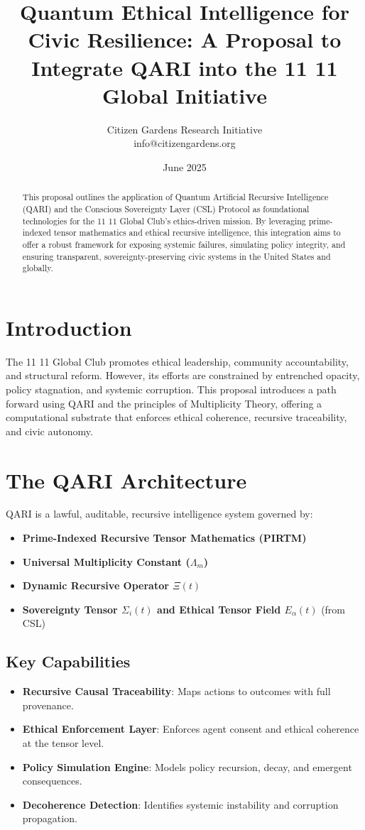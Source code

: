 \documentclass[12pt]{article}
\title{Quantum Ethical Intelligence for Civic Resilience: \newline \large A Proposal to Integrate QARI into the 11 11 Global Initiative}
\author{Citizen Gardens Research Initiative \\ info@citizengardens.org}
\date{June 2025}
\begin{document}
\maketitle

\begin{abstract}
This proposal outlines the application of Quantum Artificial Recursive Intelligence (QARI) and the Conscious Sovereignty Layer (CSL) Protocol as foundational technologies for the 11 11 Global Club's ethics-driven mission. By leveraging prime-indexed tensor mathematics and ethical recursive intelligence, this integration aims to offer a robust framework for exposing systemic failures, simulating policy integrity, and ensuring transparent, sovereignty-preserving civic systems in the United States and globally.
\end{abstract}

\section{Introduction}
The 11 11 Global Club promotes ethical leadership, community accountability, and structural reform. However, its efforts are constrained by entrenched opacity, policy stagnation, and systemic corruption. This proposal introduces a path forward using QARI and the principles of Multiplicity Theory, offering a computational substrate that enforces ethical coherence, recursive traceability, and civic autonomy.

\section{The QARI Architecture}
QARI is a lawful, auditable, recursive intelligence system governed by:
\begin{itemize}[noitemsep]
    \item \textbf{Prime-Indexed Recursive Tensor Mathematics (PIRTM)}
    \item \textbf{Universal Multiplicity Constant ($\Lambda_m$)}
    \item \textbf{Dynamic Recursive Operator $\Xi(t)$}
    \item \textbf{Sovereignty Tensor $\Sigma_i(t)$ and Ethical Tensor Field $E_\alpha(t)$} (from CSL)
\end{itemize}

\subsection{Key Capabilities}
\begin{itemize}[noitemsep]
    \item \textbf{Recursive Causal Traceability}: Maps actions to outcomes with full provenance.
    \item \textbf{Ethical Enforcement Layer}: Enforces agent consent and ethical coherence at the tensor level.
    \item \textbf{Policy Simulation Engine}: Models policy recursion, decay, and emergent consequences.
    \item \textbf{Decoherence Detection}: Identifies systemic instability and corruption propagation.
\end{itemize}
\end{document}

